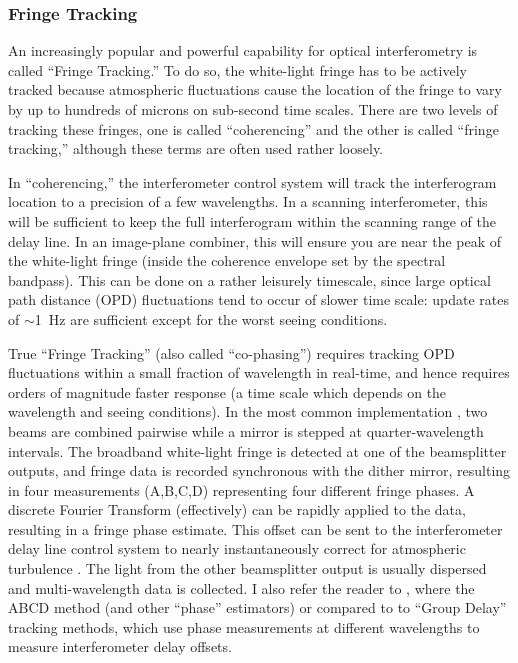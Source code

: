 \documentclass[12pt]{iopart}
\begin{document}
\subsubsection{Fringe Tracking}
An increasingly popular and powerful capability for optical
interferometry is called ``Fringe Tracking.''  To do so, the white-light fringe
has to be actively tracked because atmospheric fluctuations cause the
location of the fringe to vary by up to hundreds of microns on
sub-second time scales.  There are two levels of tracking these
fringes, one is called ``coherencing'' and the other is called
``fringe tracking,'' although these terms are often used rather
loosely.  

In ``coherencing,'' the interferometer control system will track the
interferogram location to a precision of a few wavelengths. In a
scanning interferometer, this will be sufficient to keep the full
interferogram within the scanning range of the delay line.  In an
image-plane combiner, this will ensure you are near the peak of the
white-light fringe (inside the coherence envelope set by the spectral
bandpass).  This can be done on a rather leisurely timescale, since
large optical path distance (OPD) fluctuations tend to occur of slower
time scale: update rates of $\sim$1~Hz are sufficient except for the
worst seeing conditions.

True ``Fringe Tracking'' (also called ``co-phasing'') requires
tracking OPD fluctuations within a small fraction of wavelength in
real-time, and hence requires orders of magnitude faster response (a
time scale which depends on the wavelength and seeing conditions).  In
the most common implementation \citep[the ``ABCD'' method; see][]{shao1977},
two beams are
combined pairwise while a mirror is stepped at quarter-wavelength
intervals.  The broadband white-light fringe is detected at one of the
beamsplitter outputs, and fringe data is recorded synchronous with the
dither mirror, resulting in four measurements (A,B,C,D) representing
four different fringe phases.  A discrete Fourier Transform
(effectively) can be rapidly applied to the data, resulting in a
fringe phase estimate. This offset can be sent to the interferometer
delay line control system to nearly instantaneously correct for
atmospheric turbulence \citep[details in][]{markiii,colavita1999}.
The light from the other beamsplitter output is usually dispersed and
multi-wavelength data is collected.  I also refer the reader to
\citet{lawsonchap2000}, where the ABCD method (and other ``phase''
estimators) or compared to to ``Group Delay'' tracking methods, which
use phase measurements at different wavelengths to measure
interferometer delay offsets.
\end{document}
